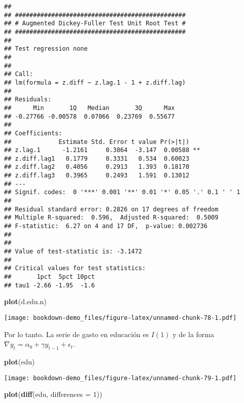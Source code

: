 \documentclass[]{book}
\newenvironment{Shaded}{\begin{snugshade}}{\end{snugshade}}
\newcommand{\KeywordTok}[1]{\textcolor[rgb]{0.13,0.29,0.53}{\textbf{#1}}}
\newcommand{\DataTypeTok}[1]{\textcolor[rgb]{0.13,0.29,0.53}{#1}}
\newcommand{\DecValTok}[1]{\textcolor[rgb]{0.00,0.00,0.81}{#1}}
\newcommand{\NormalTok}[1]{#1}
\theoremstyle{definition}
\theoremstyle{definition}
\theoremstyle{definition}
\theoremstyle{remark}
\begin{document}
\begin{verbatim}
## 
## ############################################### 
## # Augmented Dickey-Fuller Test Unit Root Test # 
## ############################################### 
## 
## Test regression none 
## 
## 
## Call:
## lm(formula = z.diff ~ z.lag.1 - 1 + z.diff.lag)
## 
## Residuals:
##      Min       1Q   Median       3Q      Max 
## -0.27766 -0.00578  0.07066  0.23769  0.55677 
## 
## Coefficients:
##             Estimate Std. Error t value Pr(>|t|)   
## z.lag.1      -1.2161     0.3864  -3.147  0.00588 **
## z.diff.lag1   0.1779     0.3331   0.534  0.60023   
## z.diff.lag2   0.4056     0.2913   1.393  0.18170   
## z.diff.lag3   0.3965     0.2493   1.591  0.13012   
## ---
## Signif. codes:  0 '***' 0.001 '**' 0.01 '*' 0.05 '.' 0.1 ' ' 1
## 
## Residual standard error: 0.2826 on 17 degrees of freedom
## Multiple R-squared:  0.596,  Adjusted R-squared:  0.5009 
## F-statistic:  6.27 on 4 and 17 DF,  p-value: 0.002736
## 
## 
## Value of test-statistic is: -3.1472 
## 
## Critical values for test statistics: 
##       1pct  5pct 10pct
## tau1 -2.66 -1.95  -1.6
\end{verbatim}

\begin{Shaded}
\begin{Highlighting}[]
\KeywordTok{plot}\NormalTok{(d.edu.n)}
\end{Highlighting}
\end{Shaded}

\texttt{[image: bookdown-demo\_files/figure-latex/unnamed-chunk-78-1.pdf]}

Por lo tanto. La serie de gasto en educación es \(I(1)\) y de la forma
\(\nabla y_t = \alpha_0 + \gamma y_{t-1}+ \epsilon_t\).

\begin{Shaded}
\begin{Highlighting}[]
\KeywordTok{plot}\NormalTok{(edu)}
\end{Highlighting}
\end{Shaded}

\texttt{[image: bookdown-demo\_files/figure-latex/unnamed-chunk-79-1.pdf]}

\begin{Shaded}
\begin{Highlighting}[]
\KeywordTok{plot}\NormalTok{(}\KeywordTok{diff}\NormalTok{(edu, }\DataTypeTok{differences =} \DecValTok{1}\NormalTok{))}
\end{Highlighting}
\end{Shaded}
\end{document}
